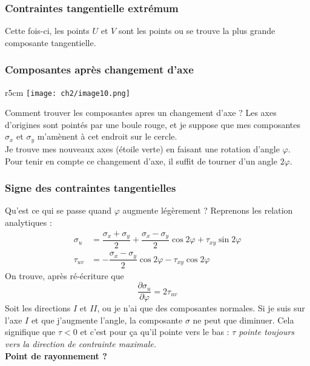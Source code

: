     \subsubsection{Contraintes tangentielle extrémum}
    Cette fois-ci, les points $U$ et $V$ sont les points ou se trouve la plus grande composante tangentielle.
    
    \subsubsection{Composantes après changement d'axe}
    \begin{wrapfigure}[7]{r}{5cm}
    \texttt{[image: ch2/image10.png]}
    \end{wrapfigure}
    Comment trouver les composantes apres un changement d'axe ? Les axes d'origines sont pointés par une boule
    rouge, et je suppose que mes composantes $\sigma_x$ et $\sigma_y$ m'amènent à cet endroit sur le cercle.\\
    
    Je trouve mes nouveaux axes (étoile verte) en faisant une rotation d'angle $\varphi$. Pour tenir en compte
    ce changement d'axe, il suffit de tourner d'un angle $2\varphi$.
    
    \subsubsection{Signe des contraintes tangentielles}

    Qu'est ce qui se passe quand $\varphi$ augmente légèrement ? Reprenons les relation analytiques :
    \begin{equation}
    \begin{array}{ll}
    \sigma_u &= \dfrac{\sigma_x+\sigma_y}{2} + \dfrac{\sigma_x-\sigma_y}{2}\cos 2\varphi + \tau_{xy}\sin
    2\varphi\\
    \tau_{uv} &= -\dfrac{\sigma_x-\sigma_y}{2}\cos 2\varphi - \tau_{xy}\cos 2\varphi
    \end{array}
    \end{equation}       
    On trouve, après ré-écriture que 
    \begin{equation}
    \frac{\partial \sigma_u}{\partial \varphi} = 2\tau_{uv}
    \end{equation}
    Soit les directions $I$ et $II$, ou je n'ai que des composantes normales. Si je suis sur l'axe $I$ et que
    j'augmente l'angle, la composante $\sigma$ ne peut que diminuer. Cela signifique que $\tau < 0$ et c'est
    pour ça qu'il pointe vers le bas : \textit{$\tau$ pointe toujours vers la direction de contrainte maximale.}
    \\ \textbf{Point de rayonnement ?}
    
